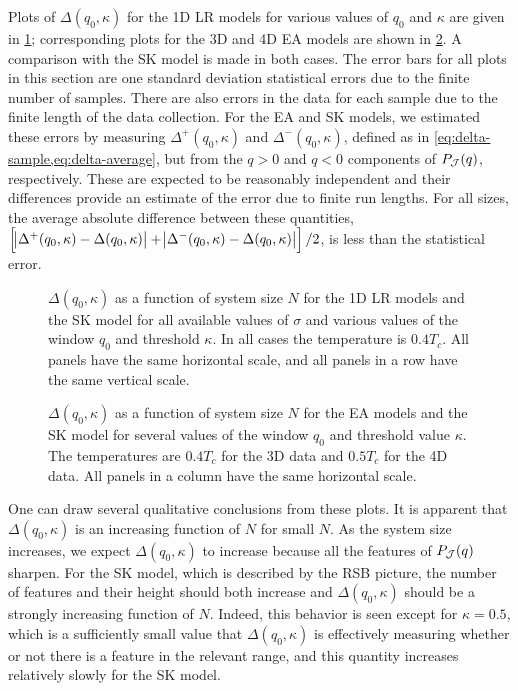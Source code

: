 Plots of $\Delta(q_0,\kappa)$ for the 1D LR models for various values of $q_0$
and $\kappa$ are given in \cref{fig:delta-1dlr}; corresponding plots for the 3D
and 4D EA models are shown in \cref{fig:delta-ea}. A comparison with the SK
model is made in both cases. The error bars for all plots in this section are
one standard deviation statistical errors due to the finite number of samples.
There are also errors in the data for each sample due to the finite length of
the data collection. For the EA and SK models, we estimated these errors by
measuring $\Delta^+(q_0,\kappa)$ and $\Delta^-(q_0,\kappa)$, defined as in
\cref{eq:delta-sample,eq:delta-average}, but from the $q>0$ and $q<0$
components of $P_{\mathcal{J}}(q)$, respectively. These are expected to be
reasonably independent and their differences provide an estimate of the error
due to finite run lengths. For all sizes, the average absolute difference
between these quantities,
$\left[\abs{\Delta^+(q_0,\kappa)-\Delta(q_0,\kappa)}
     +\abs{\Delta^-(q_0,\kappa)-\Delta(q_0,\kappa)}\right]/2$,
is less than the statistical error.
\begin{figure}
  \centering
  
  \caption[
    Peak-counting statistic $\Delta(q_0,\kappa)$ for one-dimensional long-range
    spin glasses and the Sherrington-Kirckpatrick model.
  ]
  {
    $\Delta(q_0,\kappa)$ as a function of system size $N$ for the 1D LR
    models and the SK model for all available values of $\sigma$ and various
    values of the window $q_0$ and threshold $\kappa$. In all cases the
    temperature is $0.4 T_c$. All panels have the same horizontal scale, and
    all panels in a row have the same vertical scale.
  }
  \label{fig:delta-1dlr}
\end{figure}

\begin{figure}
  \centering
  
  \caption[
    Peak-counting statistic $\Delta(q_0,\kappa)$ for the three- and
    four-dimensional Edwards-Anderson models and the Sherrington-Kirkpatrick
    model.
  ]
  {
    $\Delta(q_0,\kappa)$ as a function of system size $N$ for the EA models and
    the SK model for several values of the window $q_0$ and threshold value
    $\kappa$. The temperatures are $0.4 T_c$ for the 3D data and $0.5 T_c$ for
    the 4D data. All panels in a column have the same horizontal scale.
  }
  \label{fig:delta-ea}
\end{figure}

One can draw several qualitative conclusions from these plots. It is apparent
that $\Delta(q_0,\kappa)$ is an increasing function of $N$ for small $N$. As
the system size increases, we expect $\Delta(q_0,\kappa)$ to increase because
all the features of $P_{\mathcal{J}}(q)$ sharpen. For the SK model, which is
described by the RSB picture, the number of features and their height should
both increase and $\Delta(q_0,\kappa)$ should be a strongly increasing function
of $N$. Indeed, this behavior is seen except for $\kappa=0.5$, which is a
sufficiently small value that $\Delta(q_0,\kappa)$ is effectively measuring
whether or not there is a feature in the relevant range, and this quantity
increases relatively slowly for the SK model.

